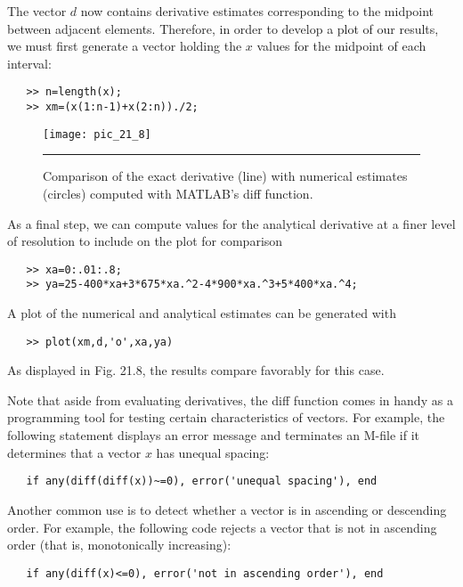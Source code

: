 \documentclass[../main.tex]{subfiles}
\begin{document}
The vector $d$ now contains derivative estimates corresponding to the midpoint between adjacent elements. Therefore, in order to develop a plot of our results, we must first
generate a vector holding the $x$ values for the midpoint of each interval:

\begin{verbatim}
   >> n=length(x);
   >> xm=(x(1:n-1)+x(2:n))./2;
\end{verbatim}
\pagebreak
\begin{figure}[hbt!]
	\centering
	\texttt{[image: pic\_21\_8]}
	\caption{\textsf{Comparison of the exact derivative (line) with numerical estimates (circles) computed with
MATLAB's diff function.}} \vspace{0.1in} \hrule
	\label{pic.21.8}
\end{figure}
As a final step, we can compute values for the analytical derivative at a finer level of resolution to include on the plot for comparison

\begin{verbatim}
   >> xa=0:.01:.8;
   >> ya=25-400*xa+3*675*xa.^2-4*900*xa.^3+5*400*xa.^4;
\end{verbatim}
A plot of the numerical and analytical estimates can be generated with
\begin{verbatim}
   >> plot(xm,d,'o',xa,ya)
\end{verbatim}
As displayed in Fig. 21.8, the results compare favorably for this case.
\vspace{0.4in}

Note that aside from evaluating derivatives, the diff function comes in handy as a
programming tool for testing certain characteristics of vectors. For example, the following
statement displays an error message and terminates an M-file if it determines that a vector
$x$ has unequal spacing:
\begin{verbatim}
   if any(diff(diff(x))~=0), error('unequal spacing'), end
\end{verbatim}

Another common use is to detect whether a vector is in ascending or descending order.
For example, the following code rejects a vector that is not in ascending order (that is, monotonically increasing):
\begin{verbatim}
   if any(diff(x)<=0), error('not in ascending order'), end
\end{verbatim}
\end{document}
